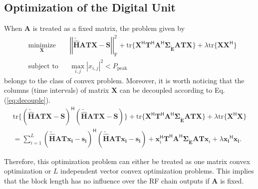 \documentclass[12pt,draftclsnofoot,onecolumn,journal]{IEEEtran}
\begin{document}
\subsection{Optimization of the Digital Unit}
When $\mathbf A$ is treated as a fixed matrix, the problem given by
\begin{equation}
\begin{aligned}
& \underset{\mathbf X}{\text{minimize}}
& &\left|\left|\tilde{\hat{\mathbf H}}\mathbf{ATX}-\mathbf{S}\right|\right|_{\mathrm{F}}^2+\mathrm{tr}\{\mathbf X^{\mathsf H}\mathbf T^{\mathsf H}\mathbf A^{\mathsf H}
\pmb{\Sigma_{\tilde{\mathbf E}}}\mathbf{ATX}\}+\lambda\mathrm{tr}\{\mathbf X\mathbf X^{\mathsf H}\}\\
& \text{subject to}
& &\max_{i,j} |x_{i,j}|^2<P_{\mathrm{peak}}
\label{opt:rfcopt}
\end{aligned}
\end{equation}
belongs to the class of convex problem. Moreover, it is worth noticing that the columns (time intervals) of matrix $\mathbf X$ can be decoupled according to Eq. (\ref{eq:decouple}).
\begin{equation}
\begin{split}
\mathrm{tr}\{(\tilde{\hat{\mathbf H}}\mathbf{ATX}-\mathbf{S})^{\mathsf H}(\tilde{\hat{\mathbf H}}\mathbf{ATX}-\mathbf{S})\}+\mathrm{tr}\{\mathbf X^{\mathsf H}\mathbf T^{\mathsf H}\mathbf A^{\mathsf H}
\pmb{\Sigma_{\tilde{\mathbf E}}}\mathbf{ATX}\}+\lambda \mathrm{tr}\{\mathbf{X}^{\mathsf H}\mathbf{X}\}\\
=\sum_{i=1}^L(\tilde{\hat{\mathbf H}}\mathbf{AT}\boldsymbol{x_i}-\boldsymbol{s_i})^{\mathsf H}(\tilde{\hat{\mathbf H}}\mathbf{AT}\boldsymbol{x_i}-\boldsymbol{s_i})+
\mathbf x_i^{\mathsf H}\mathbf T^{\mathsf H}\mathbf A^{\mathsf H}
\pmb{\Sigma_{\tilde{\mathbf E}}}\mathbf{ATx}_i
+\lambda \boldsymbol{x_i}^{\mathsf H}\boldsymbol{x_i}.
\label{eq:decouple}
\end{split}
\end{equation}

Therefore, this optimization problem can either be treated as one matrix convex optimization or $L$ independent vector convex optimization problems. This implies that the block length has no influence over the RF chain outputs if $\mathbf A$ is fixed. 
\end{document}
